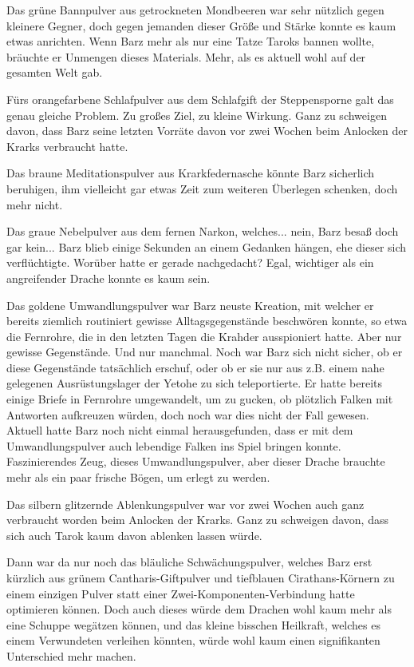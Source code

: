 Das grüne Bannpulver aus getrockneten Mondbeeren war sehr nützlich gegen kleinere Gegner, doch gegen jemanden dieser Größe und Stärke konnte es kaum etwas anrichten. Wenn Barz mehr als nur eine Tatze Taroks bannen wollte, bräuchte er Unmengen dieses Materials. Mehr, als es aktuell wohl auf der gesamten Welt gab.

Fürs orangefarbene Schlafpulver aus dem Schlafgift der Steppensporne galt das genau gleiche Problem. Zu großes Ziel, zu kleine Wirkung. Ganz zu schweigen davon, dass Barz seine letzten Vorräte davon vor zwei Wochen beim Anlocken der Krarks verbraucht hatte.

Das braune Meditationspulver aus Krarkfedernasche könnte Barz sicherlich beruhigen, ihm vielleicht gar etwas Zeit zum weiteren Überlegen schenken, doch mehr nicht.

Das graue Nebelpulver aus dem fernen Narkon, welches... nein, Barz besaß doch gar kein... Barz blieb einige Sekunden an einem Gedanken hängen, ehe dieser sich verflüchtigte. Worüber hatte er gerade nachgedacht? Egal, wichtiger als ein angreifender Drache konnte es kaum sein.

Das goldene Umwandlungspulver war Barz neuste Kreation, mit welcher er bereits ziemlich routiniert gewisse Alltagsgegenstände beschwören konnte, so etwa die Fernrohre, die in den letzten Tagen die Krahder ausspioniert hatte. Aber nur gewisse Gegenstände. Und nur manchmal. Noch war Barz sich nicht sicher, ob er diese Gegenstände tatsächlich erschuf, oder ob er sie nur aus z.B. einem nahe gelegenen Ausrüstungslager der Yetohe zu sich teleportierte. Er hatte bereits einige Briefe in Fernrohre umgewandelt, um zu gucken, ob plötzlich Falken mit Antworten aufkreuzen würden, doch noch war dies nicht der Fall gewesen. Aktuell hatte Barz noch nicht einmal herausgefunden, dass er mit dem Umwandlungspulver auch lebendige Falken ins Spiel bringen konnte. Faszinierendes Zeug, dieses Umwandlungspulver, aber dieser Drache brauchte mehr als ein paar frische Bögen, um erlegt zu werden.

Das silbern glitzernde Ablenkungspulver war vor zwei Wochen auch ganz verbraucht worden beim Anlocken der Krarks. Ganz zu schweigen davon, dass sich auch Tarok kaum davon ablenken lassen würde.

Dann war da nur noch das bläuliche Schwächungspulver, welches Barz erst kürzlich aus grünem Cantharis-Giftpulver und tiefblauen Cirathans-Körnern zu einem einzigen Pulver statt einer Zwei-Komponenten-Verbindung hatte optimieren können. Doch auch dieses würde dem Drachen wohl kaum mehr als eine Schuppe wegätzen können, und das kleine bisschen Heilkraft, welches es einem Verwundeten verleihen könnten, würde wohl kaum einen signifikanten Unterschied mehr machen.

